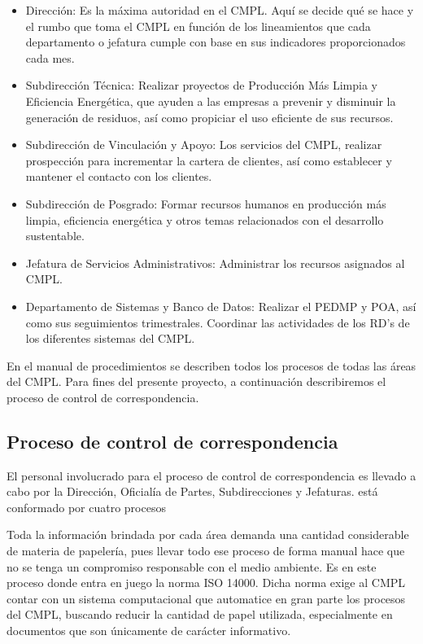 	\begin{itemize}
		\item Dirección: Es la máxima autoridad en el CMPL. Aquí se decide qué se hace y el rumbo que toma el CMPL en función de los lineamientos que cada departamento o jefatura cumple con base en sus indicadores proporcionados cada mes.
		\item Subdirección Técnica: Realizar proyectos de Producción Más Limpia y Eficiencia Energética, que  ayuden a las empresas a prevenir y disminuir la generación de residuos, así como propiciar el uso eficiente de sus recursos. \cite{SIGTecnica}
		\item Subdirección de Vinculación y Apoyo: Los servicios del CMPL, realizar prospección para incrementar la cartera de clientes, así como establecer y mantener el contacto con los clientes. \cite{SIGVinculacion}
		\item Subdirección de Posgrado: Formar recursos humanos en producción más limpia, eficiencia energética y otros temas relacionados con el desarrollo sustentable. \cite{SIGPosgrado}
		\item Jefatura de Servicios Administrativos: Administrar los recursos asignados al CMPL. \cite{SIGAdministrativa}
		\item Departamento de Sistemas y Banco de Datos: Realizar el PEDMP y POA, así como sus seguimientos trimestrales. Coordinar las actividades de los RD's de los diferentes sistemas del CMPL. \cite{SIGSistemas}
	\end{itemize}
	
	En el manual de procedimientos se describen todos los procesos de todas las áreas del CMPL. Para fines del presente proyecto, a continuación describiremos el proceso de control de correspondencia.
	
	\subsection{Proceso de control de correspondencia}
	
	
	
	
	
	
	El personal involucrado para el proceso de control de correspondencia es llevado a cabo por la  Dirección, Oficialía de Partes, Subdirecciones y Jefaturas. está conformado por cuatro procesos 
	
	Toda la información brindada por cada área demanda una cantidad considerable de materia de papelería, pues llevar todo ese proceso de forma manual hace que no se tenga un compromiso responsable con el medio ambiente.  Es en este proceso donde entra en juego la norma ISO 14000. Dicha norma exige al CMPL contar con un sistema computacional que automatice en gran parte los procesos del CMPL, buscando reducir la cantidad de papel utilizada, especialmente en documentos que son únicamente de carácter informativo.\\
	
